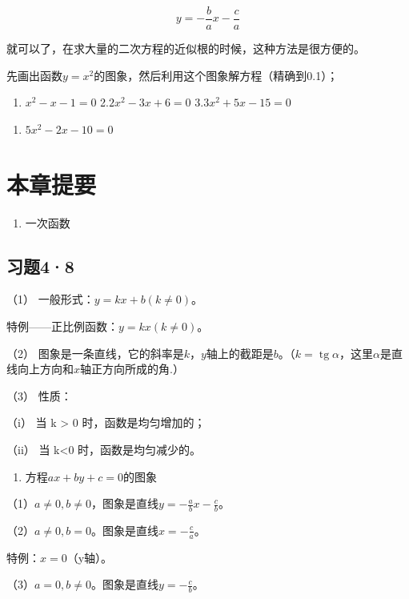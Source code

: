 \[
y = - \frac{b}{a} x - \frac{c}{a}
\]

就可以了，在求大量的二次方程的近似根的时候，这种方法是很方便的。

先画出函数\(y = x^2\)的图象，然后利用这个图象解方程（精确到0.1）；

\begin{enumerate}[start=1]
\item
  \(x^{2} - x - 1 = 0\) 2.\(2x^{2} - 3x + 6 = 0\) 3.\(3x^{2}+5x-15=0\)
\end{enumerate}
\begin{enumerate}[start=4]
\item
  \(5x^{2}-2x-10=0\)
\end{enumerate}

\section{本章提要}

\begin{enumerate}
\item
  一次函数
\end{enumerate}

\subsection{习题4·8}

（1） 一般形式：\(y = kx + b (k \neq 0)\)。

特例------正比例函数：\(y=kx(k\neq0)\)。

（2）
图象是一条直线，它的斜率是\(k\)，\(y\)轴上的截距是\(b\)。（\(k = \operatorname{tg} \alpha\)，这里\(\alpha\)是直线向上方向和\(x\)轴正方向所成的角.）

（3） 性质：

（i） 当 k \textgreater{} 0 时，函数是均匀增加的；

（ii） 当 k\textless0 时，函数是均匀减少的。

\begin{enumerate}[start=2]
\item
  方程\(ax + by + c = 0\)的图象
\end{enumerate}

（1）\(a \neq 0, b \neq 0\)，图象是直线\(y = -\frac{a}{b} x - \frac{c}{b}\)。

（2）\(a \neq 0, b = 0\)。图象是直线\(x = -\frac{c}{a}\)。

特例：\(x = 0\)（y轴）。

（3）\(a = 0, b \neq 0\)。图象是直线\(y = -\frac{c}{b}\)。

